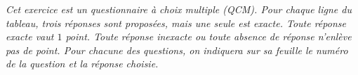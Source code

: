 \documentclass[10pt]{article}
\begin{document}
\setlength\parindent{0mm}
\pagestyle{fancy}
\thispagestyle{empty}
    
    
    




\medskip

\emph{Cet exercice est un questionnaire à choix multiple (QCM). Pour chaque ligne du tableau, trois réponses sont proposées, mais une seule est exacte. Toute réponse exacte vaut $1$ point. Toute réponse inexacte ou toute absence de réponse n'enlève pas de point. Pour chacune des questions, on indiquera sur sa feuille le numéro de la question et la réponse choisie.}

\medskip
\end{document}
